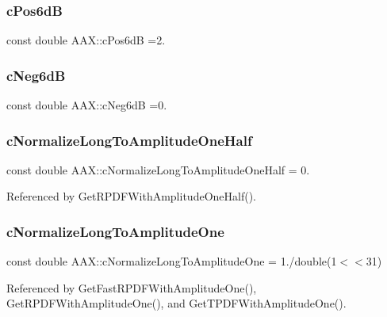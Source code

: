 \subsubsection{\texorpdfstring{cPos6dB}{cPos6dB}}
{\footnotesize\ttfamily const double A\+A\+X\+::c\+Pos6dB =2.}

\mbox{\label{a00852_aca5925abc898233b406504d92ee9ef4c}} 
\subsubsection{\texorpdfstring{cNeg6dB}{cNeg6dB}}
{\footnotesize\ttfamily const double A\+A\+X\+::c\+Neg6dB =0.}

\mbox{\label{a00852_a93ce2d3935dc06b1c4c887568df84788}} 
\subsubsection{\texorpdfstring{cNormalizeLongToAmplitudeOneHalf}{cNormalizeLongToAmplitudeOneHalf}}
{\footnotesize\ttfamily const double A\+A\+X\+::c\+Normalize\+Long\+To\+Amplitude\+One\+Half = 0.}



Referenced by Get\+R\+P\+D\+F\+With\+Amplitude\+One\+Half().

\mbox{\label{a00852_ad30333177ff94148492a02325045a827}} 
\subsubsection{\texorpdfstring{cNormalizeLongToAmplitudeOne}{cNormalizeLongToAmplitudeOne}}
{\footnotesize\ttfamily const double A\+A\+X\+::c\+Normalize\+Long\+To\+Amplitude\+One = 1./double(1$<$$<$31)}



Referenced by Get\+Fast\+R\+P\+D\+F\+With\+Amplitude\+One(), Get\+R\+P\+D\+F\+With\+Amplitude\+One(), and Get\+T\+P\+D\+F\+With\+Amplitude\+One().

\mbox{\label{a00852_a1b66f305f76b3f27b75c275c805c3d9b}} 
